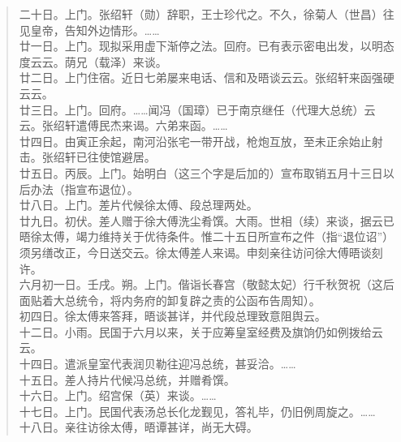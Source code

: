 \begin{quote}
	二十日。上门。张绍轩（勋）辞职，王士珍代之。不久，徐菊人（世昌）往见皇帝，告知外边情形。……\\

廿一日。上门。现拟采用虚下渐停之法。回府。已有表示密电出发，以明态度云云。荫兄（载泽）来谈。\\

廿二日。上门住宿。近日七弟屡来电话、信和及晤谈云云。张绍轩来函强硬云云。\\

廿三日。上门。回府。……闻冯（国璋）已于南京继任（代理大总统）云云。张绍轩遣傅民杰来谒。六弟来函。……\\

廿四日。由寅正余起，南河沿张宅一带开战，枪炮互放，至未正余始止射击。张绍轩已往使馆避居。\\

廿五日。丙辰。上门。始明白（这三个字是后加的）宣布取销五月十三日以后办法（指宣布退位）。\\

廿八日。上门。差片代候徐太傅、段总理两处。\\

廿九日。初伏。差人赠于徐大傅洗尘肴馔。大雨。世相（续）来谈，据云已晤徐太傅，竭力维持关于优待条件。惟二十五日所宣布之件（指“退位诏”）须另缮改正，今日送交云。徐太傅差人来谒。申刻亲往访问徐大傅晤谈刻许。\\

六月初一日。壬戌。朔。上门。偕诣长春宫（敬懿太妃）行千秋贺祝（这后面贴着大总统令，将内务府的卸复辟之责的公函布告周知）。\\

初四日。徐太傅来答拜，晤谈甚详，并代段总理致意阻舆云。\\

十二日。小雨。民国于六月以来，关于应筹皇室经费及旗饷仍如例拨给云云。\\

十四日。遣派皇室代表润贝勒往迎冯总统，甚妥洽。……\\

十五日。差人持片代候冯总统，并赠肴馔。\\

十六日。上门。绍宫保（英）来谈。……\\

十七日。上门。民国代表汤总长化龙觐见，答礼毕，仍旧例周旋之。……\\

十八日。亲往访徐太傅，晤谭甚详，尚无大碍。\\


\end{quote}
